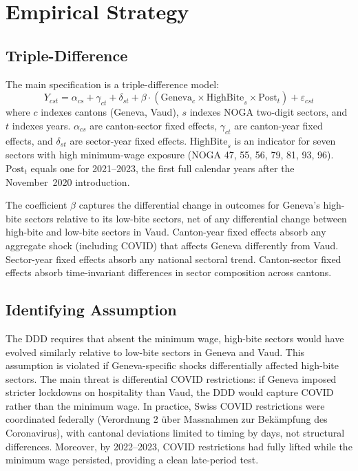 \documentclass[12pt]{article}
\begin{document}
\section{Empirical Strategy}
\label{sec:strategy}

\subsection{Triple-Difference}

The main specification is a triple-difference model:
\begin{equation}
\label{eq:ddd}
Y_{cst} = \alpha_{cs} + \gamma_{ct} + \delta_{st} + \beta \cdot (\text{Geneva}_c \times \text{HighBite}_s \times \text{Post}_t) + \varepsilon_{cst}
\end{equation}
where $c$ indexes cantons (Geneva, Vaud), $s$ indexes NOGA two-digit sectors, and $t$ indexes years. $\alpha_{cs}$ are canton-sector fixed effects, $\gamma_{ct}$ are canton-year fixed effects, and $\delta_{st}$ are sector-year fixed effects. $\text{HighBite}_s$ is an indicator for seven sectors with high minimum-wage exposure (NOGA 47, 55, 56, 79, 81, 93, 96). $\text{Post}_t$ equals one for 2021--2023, the first full calendar years after the November~2020 introduction.

The coefficient $\beta$ captures the differential change in outcomes for Geneva's high-bite sectors relative to its low-bite sectors, net of any differential change between high-bite and low-bite sectors in Vaud. Canton-year fixed effects absorb any aggregate shock (including COVID) that affects Geneva differently from Vaud. Sector-year fixed effects absorb any national sectoral trend. Canton-sector fixed effects absorb time-invariant differences in sector composition across cantons.

\subsection{Identifying Assumption}

The DDD requires that absent the minimum wage, high-bite sectors would have evolved similarly relative to low-bite sectors in Geneva and Vaud. This assumption is violated if Geneva-specific shocks differentially affected high-bite sectors. The main threat is differential COVID restrictions: if Geneva imposed stricter lockdowns on hospitality than Vaud, the DDD would capture COVID rather than the minimum wage. In practice, Swiss COVID restrictions were coordinated federally (Verordnung 2 \"{u}ber Massnahmen zur Bek\"{a}mpfung des Coronavirus), with cantonal deviations limited to timing by days, not structural differences. Moreover, by 2022--2023, COVID restrictions had fully lifted while the minimum wage persisted, providing a clean late-period test.
\end{document}
